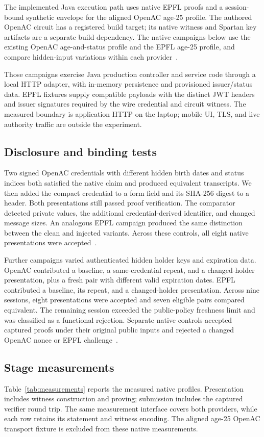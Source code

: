 \documentclass[10pt,twocolumn,letterpaper]{article}
\begin{document}
The implemented Java execution path uses native EPFL proofs and a session-bound synthetic envelope for the aligned OpenAC age-25 profile. The authored OpenAC circuit has a registered build target; its native witness and Spartan key artifacts are a separate build dependency. The native campaigns below use the existing OpenAC age-and-status profile and the EPFL age-25 profile, and compare hidden-input variations within each provider~\cite{artifact}.

Those campaigns exercise Java production controller and service code through a local HTTP adapter, with in-memory persistence and provisioned issuer/status data. EPFL fixtures supply compatible payloads with the distinct JWT headers and issuer signatures required by the wire credential and circuit witness. The measured boundary is application HTTP on the laptop; mobile UI, TLS, and live authority traffic are outside the experiment.

\subsection{Disclosure and binding tests}
Two signed OpenAC credentials with different hidden birth dates and status indices both satisfied the native claim and produced equivalent transcripts. We then added the compact credential to a form field and its SHA-256 digest to a header. Both presentations still passed proof verification. The comparator detected private values, the additional credential-derived identifier, and changed message sizes. An analogous EPFL campaign produced the same distinction between the clean and injected variants. Across these controls, all eight native presentations were accepted~\cite{artifact}.

Further campaigns varied authenticated hidden holder keys and expiration data. OpenAC contributed a baseline, a same-credential repeat, and a changed-holder presentation, plus a fresh pair with different valid expiration dates. EPFL contributed a baseline, its repeat, and a changed-holder presentation. Across nine sessions, eight presentations were accepted and seven eligible pairs compared equivalent. The remaining session exceeded the public-policy freshness limit and was classified as a functional rejection. Separate native controls accepted captured proofs under their original public inputs and rejected a changed OpenAC nonce or EPFL challenge~\cite{artifact}.

\subsection{Stage measurements}
Table~\ref{tab:measurements} reports the measured native profiles. Presentation includes witness construction and proving; submission includes the captured verifier round trip. The same measurement interface covers both providers, while each row retains its statement and witness encoding. The aligned age-25 OpenAC transport fixture is excluded from these native measurements.
\end{document}
